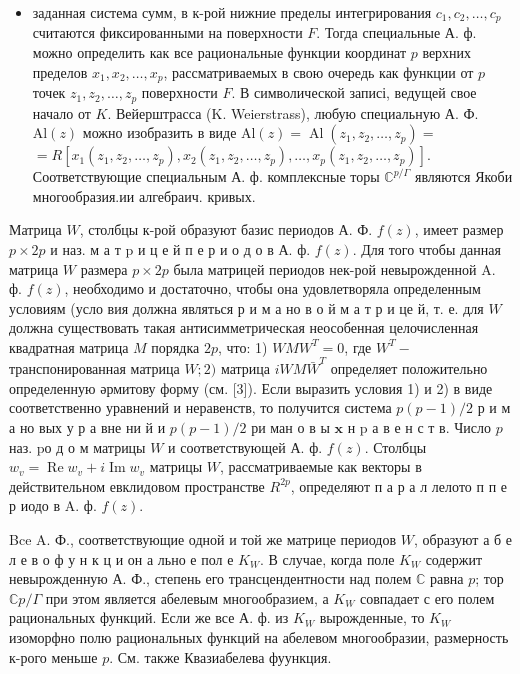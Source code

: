\documentclass[10pt]{article}
\begin{document}
\begin{itemize}

  \item заданная система сумм, в к-рой нижние пределы интегрирования $c_{1}, c_{2}, \ldots, c_{p}$ считаются фиксированными на поверхности $F$. Тогда специальные А. ф. можно определить как все рациональные функции координат $p$ верхних пределов $x_{1}, x_{2}, \ldots, x_{p}$, рассматриваемых в свою очередь как функции от $p$ точек $z_{1}, z_{2}, \ldots, z_{p}$ поверхности $F$. В символической записі, ведущей свое начало от $K$. Вейерштрасса (K. Weierstrass), любую специальную А. Ф. $\mathrm{Al}(z)$ можно изобразить в виде $\mathrm{Al}(z)=\operatorname{Al}\left(z_{1}, z_{2}, \ldots, z_{p}\right)=$ $=R\left[x_{1}\left(z_{1}, z_{2}, \ldots, z_{p}\right), x_{2}\left(z_{1}, z_{2}, \ldots, z_{p}\right), \ldots, x_{p}\left(z_{1}, z_{2}, \ldots, z_{p}\right)\right]$. Соответствующие специальным А. ф. комплексные торы $\mathbb{C}^{p / \Gamma}$ являются Якоби многообразия.ии алгебраич. кривых.

\end{itemize}



Матрица $W$, столбцы к-рой образуют базис периодов А. Ф. $f(z)$, имеет размер $p \times 2 p$ и наз. м а т $\mathrm{p}$ и ц е й п е р и о д о в А. ф. $f(z)$. Для того чтобы данная матрица $W$ размера $p \times 2 p$ была матрицей периодов нек-рой невырожденной $\mathrm{A}$. ф. $f(z)$, необходимо и достаточно, чтобы она удовлетворяла определенным условиям (усло вия должна являться р и м а но в о й м а т р и це й, т. е. для $W$ должна существовать такая антисимметрическая неособенная целочисленная квадратная матрица $M$ порядка $2 p$, что: 1) $W M W^{T}=0$, где $W^{T}-$ транспонированная матрица $W ; 2)$ матрица $i W M \bar{W}^{T}$ определяет положительно определенную әрмитову форму (см. [3]). Если выразить условия 1) и 2) в виде соответственно уравнений и неравенств, то получится система $p(p-1) / 2$ р и м а но вых у р а вне ни й и $p(p-1) / 2$ ри ман о в ы $\mathbf{x}$ н $\mathrm{p}$ а в е н с т в. Число $p$ наз. $\mathrm{p} о$ д о м матрицы $W$ и соответствующей А. ф. $f(z)$. Столбцы $w_{v}=\operatorname{Re} w_{v}+i \operatorname{Im} w_{v}$ матрицы $W$, рассматриваемые как векторы в действительном евклидовом пространстве $R^{2 p}$, определяют п а р а л лелото п п е р иодо в A. ф. $f(z)$.



Bce A. Ф., соответствующие одной и той же матрице периодов $W$, образуют а б е л е в о ф у н к ц и он а льно е пол е $K_{W}$. В случае, когда поле $K_{W}$ содержит невырожденную А. Ф., степень его трансцендентности над полем $\mathbb{C}$ равна $p$; тор $\mathbb{C} p / \Gamma$ при этом является абелевым многообразием, а $K_{W}$ совпадает с его полем рациональных функций. Если же все А. ф. из $K_{W}$ вырожденные, то $K_{W}$ изоморфно полю рациональных функций на абелевом многообразии, размерность к-рого меньше $p$. См. также Квазиабелева фуункция.
\end{document}
